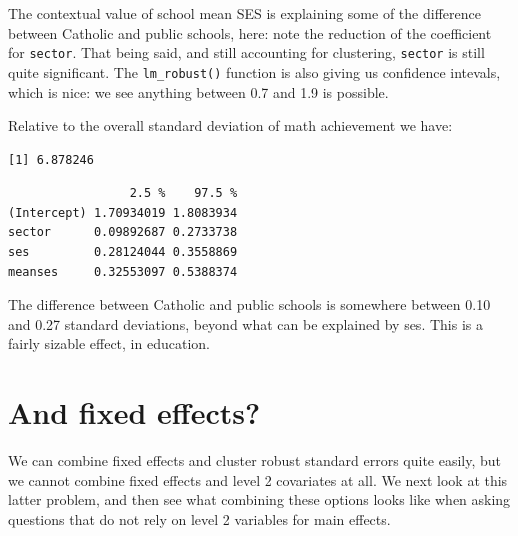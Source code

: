 \documentclass[
  letterpaper,
  DIV=11,
  numbers=noendperiod]{scrreprt}
\newenvironment{Shaded}{\begin{snugshade}}{\end{snugshade}}
\newcommand{\AttributeTok}[1]{\textcolor[rgb]{0.49,0.56,0.16}{#1}}
\newcommand{\FunctionTok}[1]{\textcolor[rgb]{0.02,0.16,0.49}{#1}}
\newcommand{\NormalTok}[1]{\textcolor[rgb]{0.00,0.44,0.13}{#1}}
\newcommand{\OtherTok}[1]{\textcolor[rgb]{0.00,0.44,0.13}{#1}}
\newcommand{\SpecialCharTok}[1]{\textcolor[rgb]{0.25,0.44,0.63}{#1}}
\begin{document}
The contextual value of school mean SES is explaining some of the
difference between Catholic and public schools, here: note the reduction
of the coefficient for \texttt{sector}. That being said, and still
accounting for clustering, \texttt{sector} is still quite significant.
The \texttt{lm\_robust()} function is also giving us confidence
intevals, which is nice: we see anything between 0.7 and 1.9 is
possible.

Relative to the overall standard deviation of math achievement we have:

\begin{Shaded}
\end{Shaded}

\begin{verbatim}
[1] 6.878246
\end{verbatim}

\begin{Shaded}
\end{Shaded}

\begin{verbatim}
                 2.5 %    97.5 %
(Intercept) 1.70934019 1.8083934
sector      0.09892687 0.2733738
ses         0.28124044 0.3558869
meanses     0.32553097 0.5388374
\end{verbatim}

The difference between Catholic and public schools is somewhere between
0.10 and 0.27 standard deviations, beyond what can be explained by ses.
This is a fairly sizable effect, in education.

\hypertarget{and-fixed-effects}{%
\section{And fixed effects?}\label{and-fixed-effects}}

We can combine fixed effects and cluster robust standard errors quite
easily, but we cannot combine fixed effects and level 2 covariates at
all. We next look at this latter problem, and then see what combining
these options looks like when asking questions that do not rely on level
2 variables for main effects.
\end{document}
